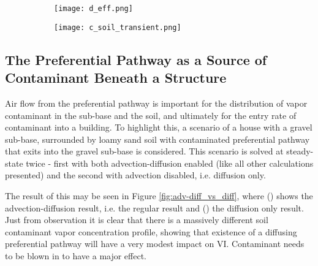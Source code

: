 \documentclass[journal=esthag,manuscript=suppinfo]{achemso}
\begin{document}
\begin{figure}[!htb]
  \caption[Soil moisture \& contaminant transport speed through soil]{In () the van Genuchten soil moisture content of various soils as a function of elevation above groundwater along with the corresponding effective diffusion of TCE in those soils. The diffusive propagation of TCE through sand soil is shown in ()}\label{fig:diffusion}
  \centering
  \begin{subfigure}[t]{0.65\textwidth}
    \centering
    \caption{ } \label{fig:soil_properties}
    \texttt{[image: d\_eff.png]}
  \end{subfigure}
  \begin{subfigure}[t]{0.3\textwidth}
    \centering
    \caption{ } \label{fig:contaminant_propagation}
    \texttt{[image: c\_soil\_transient.png]}
  \end{subfigure}
\end{figure}

\subsection{The Preferential Pathway as a Source of Contaminant Beneath a Structure}

Air flow from the preferential pathway is important for the distribution of vapor contaminant in the sub-base and the soil, and ultimately for the entry rate of contaminant into a building.
To highlight this, a scenario of a house with a gravel sub-base, surrounded by loamy sand soil with contaminated preferential pathway that exits into the gravel sub-base is considered.
This scenario is solved at steady-state twice - first with both advection-diffusion enabled (like all other calculations presented) and the second with advection disabled, i.e. diffusion only. \par

The result of this may be seen in Figure \ref{fig:adv-diff_vs_diff}, where () shows the advection-diffusion result, i.e. the regular result and () the diffusion only result.
Just from observation it is clear that there is a massively different soil contaminant vapor concentration profile, showing that existence of a diffusing preferential pathway will have a very modest impact on VI.
Contaminant needs to be blown in to have a major effect.
\end{document}
